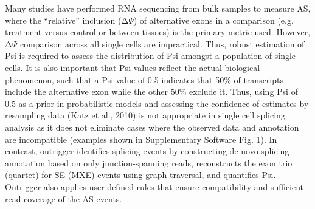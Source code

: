 Many studies have performed RNA sequencing from bulk samples to measure AS, where the “relative” inclusion (Δ$\Psi$) of alternative exons in a comparison (e.g. treatment versus control or between tissues) is the primary metric used. However, Δ$\Psi$ comparison across all single cells are impractical. Thus, robust estimation of Psi is required to assess the distribution of Psi amongst a population of single cells. It is also important that Psi values reflect the actual biological phenomenon, such that a Psi value of 0.5 indicates that 50\% of transcripts include the alternative exon while the other 50\% exclude it. Thus, using Psi of 0.5 as a prior in probabilistic models and assessing the confidence of estimates by resampling data (Katz et al., 2010) is not appropriate in single cell splicing analysis as it does not eliminate cases where the observed data and annotation are incompatible (examples shown in Supplementary Software Fig. 1). In contrast, outrigger identifies splicing events by constructing de novo splicing annotation based on only junction-spanning reads, reconstructs the exon trio (quartet) for SE (MXE) events using graph traversal, and quantifies Psi. Outrigger also applies user-defined rules that ensure compatibility and sufficient read coverage of the AS events. 

